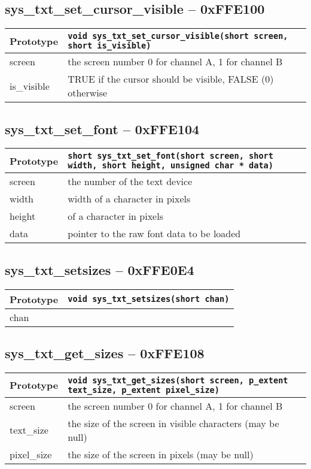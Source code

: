 \subsection*{sys\_txt\_set\_cursor\_visible -- 0xFFE100}
\begin{tabular}{|l||l|} \hline
Prototype & \lstinline!void sys_txt_set_cursor_visible(short screen, short is_visible)! \\ \hline
screen & the screen number 0 for channel A, 1 for channel B \\ \hline
is\_visible & TRUE if the cursor should be visible, FALSE (0) otherwise \\ \hline
\end{tabular}

\subsection*{sys\_txt\_set\_font -- 0xFFE104}
\begin{tabular}{|l||l|} \hline
Prototype & \lstinline!short sys_txt_set_font(short screen, short width, short height, unsigned char * data)! \\ \hline
screen & the number of the text device \\ \hline
width & width of a character in pixels \\ \hline
height & of a character in pixels \\ \hline
data & pointer to the raw font data to be loaded \\ \hline
\end{tabular}

\subsection*{sys\_txt\_setsizes -- 0xFFE0E4}
\begin{tabular}{|l||l|} \hline
Prototype & \lstinline!void sys_txt_setsizes(short chan)! \\ \hline
chan &  \\ \hline
\end{tabular}

\subsection*{sys\_txt\_get\_sizes -- 0xFFE108}
\begin{tabular}{|l||l|} \hline
Prototype & \lstinline!void sys_txt_get_sizes(short screen, p_extent text_size, p_extent pixel_size)! \\ \hline
screen & the screen number 0 for channel A, 1 for channel B \\ \hline
text\_size & the size of the screen in visible characters (may be null) \\ \hline
pixel\_size & the size of the screen in pixels (may be null) \\ \hline
\end{tabular}

